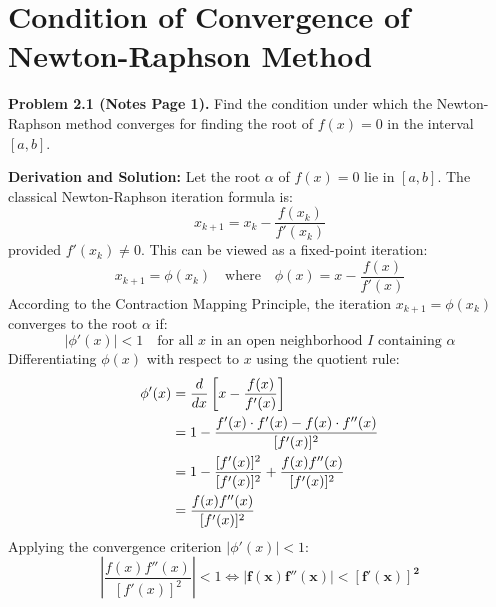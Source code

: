 \documentclass[11pt,a4paper]{article}
\numberwithin{equation}{section}
\begin{document}
\section{Condition of Convergence of Newton-Raphson Method}

\begin{thmbox}
\textbf{Problem 2.1 (Notes Page 1).}
Find the condition under which the Newton-Raphson method converges for finding the root of $f(x) = 0$ in the interval $[a, b]$.
\end{thmbox}

\begin{solbox}
\textbf{Derivation and Solution:}
Let the root $\alpha$ of $f(x) = 0$ lie in $[a, b]$. The classical Newton-Raphson iteration formula is:
\begin{equation}
    x_{k+1} = x_k - \frac{f(x_k)}{f'(x_k)} \tag{2.1}
\end{equation}
provided $f'(x_k) \ne 0$. This can be viewed as a fixed-point iteration:
\begin{equation}
    x_{k+1} = \phi(x_k) \quad \text{where} \quad \phi(x) = x - \frac{f(x)}{f'(x)} \tag{2.2}
\end{equation}
According to the Contraction Mapping Principle, the iteration $x_{k+1} = \phi(x_k)$ converges to the root $\alpha$ if:
\begin{equation}
    |\phi'(x)| < 1 \quad \text{for all } x \text{ in an open neighborhood } I \text{ containing } \alpha
\end{equation}
Differentiating $\phi(x)$ with respect to $x$ using the quotient rule:
\begin{align}
    \phi'(x) &= \frac{d}{dx} \left[ x - \frac{f(x)}{f'(x)} \right] \notag \\
    &= 1 - \frac{f'(x) \cdot f'(x) - f(x) \cdot f''(x)}{[f'(x)]^2} \notag \\
    &= 1 - \frac{[f'(x)]^2}{[f'(x)]^2} + \frac{f(x) f''(x)}{[f'(x)]^2} \notag \\
    &= \frac{f(x) f''(x)}{[f'(x)]^2}
\end{align}
Applying the convergence criterion $|\phi'(x)| < 1$:
\begin{equation}
    \left| \frac{f(x) f''(x)}{[f'(x)]^2} \right| < 1 \iff \mathbf{|f(x) f''(x)| < [f'(x)]^2}
\end{equation}
\end{solbox}
\end{document}

